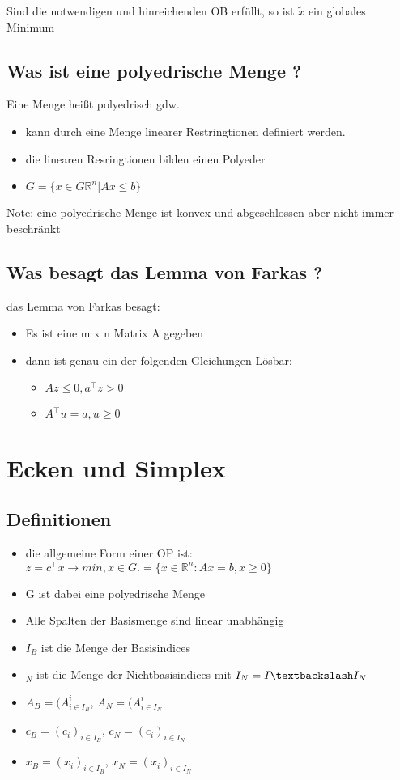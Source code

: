 \documentclass[12pt,a4paper, hyperref]{article}
\newcommand{\tsnake}[1]{\ensuremath{\tilde{#1}}}
\begin{document}
\flushleft Sind die notwendigen und hinreichenden OB erfüllt, so ist \tsnake x ein globales Minimum

\subsection{Was ist eine polyedrische Menge ?}
Eine Menge heißt polyedrisch gdw.
\begin{itemize}
\item kann durch eine Menge linearer Restringtionen definiert werden.
\item die linearen Resringtionen bilden einen Polyeder
\item $G = \{ x \in G \mathbb{R}^n | Ax \leq b \}$ 
\end{itemize}
Note: eine polyedrische Menge ist konvex und abgeschlossen aber nicht immer beschränkt


\subsection{Was besagt das Lemma von Farkas ?}
das Lemma von Farkas besagt:
\begin{itemize}
\item Es ist eine m x n Matrix A gegeben
\item dann ist genau ein der folgenden Gleichungen Lösbar:
\begin{itemize}
\item $Az \leq 0, a^\intercal z >0$
\item $A^\intercal u = a, u \geq 0$
\end{itemize}
\end{itemize}

\section{Ecken und Simplex}
\subsection{Definitionen}
\begin{itemize}
\item die allgemeine Form einer OP ist: $z = c^\intercal x \rightarrow min, x \in G .= \{x \in \mathbb{R}^n : Ax=b,x\geq 0\}$
\item G ist dabei eine polyedrische Menge
\item Alle Spalten der Basismenge sind linear unabhängig
\item $I_B$ ist die Menge der Basisindices
\item $_N$ ist die Menge der Nichtbasisindices mit $I_N = I\textbackslash I_N$
\item $A_B = (A^{i}_{i\in I_B}$, $A_N = (A^{i}_{i\in I_N}$
\item $c_B = (c_{i})_{i\in I_B}$, $c_N = (c_{i})_{i\in I_N}$
\item $x_B = (x_{i})_{i\in I_B}$, $x_N = (x_{i})_{i\in I_N}$
\end{itemize}
\end{document}
